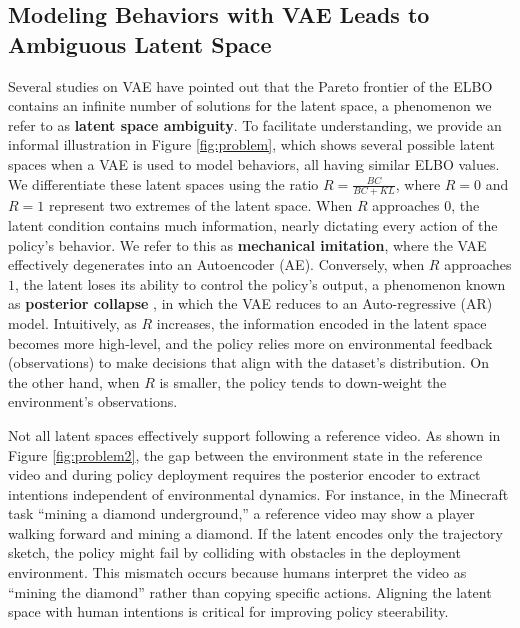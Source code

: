 \subsection{Modeling Behaviors with VAE Leads to Ambiguous Latent Space}
Several studies on VAE \citep{vae-latent-space-1, vae-latent-space-2} have pointed out that the Pareto frontier of the ELBO contains an infinite number of solutions for the latent space, a phenomenon we refer to as \textbf{latent space ambiguity}. To facilitate understanding, we provide an informal illustration in Figure \ref{fig:problem}, which shows several possible latent spaces when a VAE is used to model behaviors, all having similar ELBO values. We differentiate these latent spaces using the ratio $R = \frac{BC}{BC + KL}$, where $R = 0$ and $R = 1$ represent two extremes of the latent space. When $R$ approaches $0$, the latent condition contains much information, nearly dictating every action of the policy’s behavior. We refer to this as \textbf{mechanical imitation}, where the VAE effectively degenerates into an Autoencoder (AE). Conversely, when $R$ approaches $1$, the latent loses its ability to control the policy’s output, a phenomenon known as \textbf{posterior collapse} \citep{collapse-1, collapse-2}, in which the VAE reduces to an Auto-regressive (AR) model. Intuitively, as $R$ increases, the information encoded in the latent space becomes more high-level, and the policy relies more on environmental feedback (observations) to make decisions that align with the dataset’s distribution. On the other hand, when $R$ is smaller, the policy tends to down-weight the environment’s observations. 

Not all latent spaces effectively support following a reference video. As shown in Figure \ref{fig:problem2}, the gap between the environment state in the reference video and during policy deployment requires the posterior encoder to extract intentions independent of environmental dynamics. For instance, in the Minecraft task “mining a diamond underground,” a reference video may show a player walking forward and mining a diamond. If the latent encodes only the trajectory sketch, the policy might fail by colliding with obstacles in the deployment environment. This mismatch occurs because humans interpret the video as “mining the diamond” rather than copying specific actions. Aligning the latent space with human intentions is critical for improving policy steerability. 


